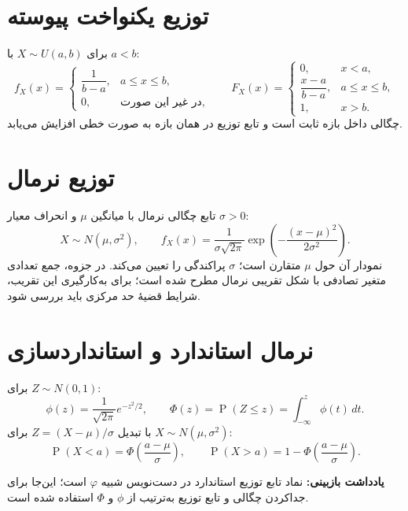 \documentclass[12pt,a4paper,oneside]{book}
\newcommand{\Prob}{\operatorname{P}}
\newcommand{\NOTE}[1]{\par\smallskip\textbf{یادداشت بازبینی:} #1\par\smallskip}
\begin{document}
\section{توزیع یکنواخت پیوسته}
برای $X\sim U(a,b)$ با $a<b$:
\begin{equation}
f_X(x)=\begin{cases}\dfrac1{b-a},&a\leq x\leq b,\\0,&\text{در غیر این صورت},\end{cases}
\qquad
F_X(x)=\begin{cases}0,&x<a,\\\dfrac{x-a}{b-a},&a\leq x\leq b,\\1,&x>b.\end{cases}
\end{equation}
چگالی داخل بازه ثابت است و تابع توزیع در همان بازه به صورت خطی افزایش می‌یابد.

\section{توزیع نرمال}
تابع چگالی نرمال با میانگین $\mu$ و انحراف معیار $\sigma>0$:
\begin{equation}\label{eq:normal}
X\sim N(\mu,\sigma^2),\qquad
f_X(x)=\frac1{\sigma\sqrt{2\pi}}\exp\!\left(-\frac{(x-\mu)^2}{2\sigma^2}\right).
\end{equation}
نمودار آن حول $\mu$ متقارن است؛ $\sigma$ پراکندگی را تعیین می‌کند. در جزوه، جمع تعدادی متغیر تصادفی با شکل تقریبی نرمال مطرح شده است؛ برای به‌کارگیری این تقریب، شرایط قضیهٔ حد مرکزی باید بررسی شود.

\section{نرمال استاندارد و استانداردسازی}
برای $Z\sim N(0,1)$:
\begin{equation}\phi(z)=\frac1{\sqrt{2\pi}}e^{-z^2/2},\qquad
\Phi(z)=\Prob(Z\leq z)=\int_{-\infty}^{z}\phi(t)\,dt.\end{equation}
با تبدیل $Z=(X-\mu)/\sigma$ برای $X\sim N(\mu,\sigma^2)$:
\begin{equation}
\Prob(X<a)=\Phi\!\left(\frac{a-\mu}{\sigma}\right),\qquad
\Prob(X>a)=1-\Phi\!\left(\frac{a-\mu}{\sigma}\right).
\end{equation}
\NOTE{نماد تابع توزیع استاندارد در دست‌نویس شبیه $\varphi$ است؛ این‌جا برای جداکردن چگالی و تابع توزیع به‌ترتیب از $\phi$ و $\Phi$ استفاده شده است.}
\end{document}
